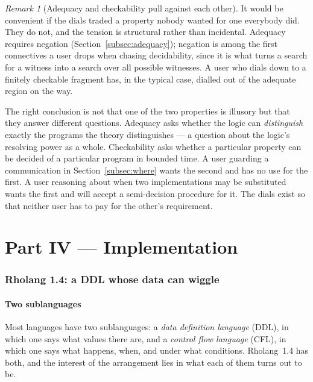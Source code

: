 \documentclass[11pt]{article}
\theoremstyle{definition}
\theoremstyle{plain}
\theoremstyle{remark}
\newtheorem{remark}[definition]{Remark}
\begin{document}
\begin{remark}[Adequacy and checkability pull against each other]
\label{rem:tension}
It would be convenient if the dials traded a property nobody wanted for one everybody did.
They do not, and the tension is structural rather than incidental. Adequacy requires
negation (Section~\ref{subsec:adequacy}); negation is among the first connectives a user
drops when chasing decidability, since it is what turns a search for a witness into a
search over all possible witnesses. A user who dials down to a finitely checkable fragment
has, in the typical case, dialled out of the adequate region on the way.

The right conclusion is not that one of the two properties is illusory but that they
answer different questions. Adequacy asks whether the logic can \emph{distinguish} exactly
the programs the theory distinguishes --- a question about the logic's resolving power as a
whole. Checkability asks whether a particular property can be decided of a particular
program in bounded time. A user guarding a communication in Section~\ref{subsec:where}
wants the second and has no use for the first. A user reasoning about when two
implementations may be substituted wants the first and will accept a semi-decision
procedure for it. The dials exist so that neither user has to pay for the other's
requirement.
\end{remark}

\part*{Part IV --- Implementation}

\section{Rholang 1.4: a DDL whose data can wiggle}
\label{sec:rholang}

\subsection{Two sublanguages}

Most languages have two sublanguages: a \emph{data definition language} (DDL), in which
one says what values there are, and a \emph{control flow language} (CFL), in which one
says what happens, when, and under what conditions. Rholang~1.4 has both, and the interest
of the arrangement lies in what each of them turns out to be.
\end{document}

